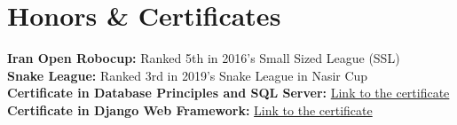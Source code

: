 
\section{Honors \& Certificates}
  \vspace{2pt}
  \resumeSubHeadingListStart
    \small{\item{
        \textbf{Iran Open Robocup:} { Ranked 5th in 2016's Small Sized League (SSL)}
        \\ \vspace{3pt}
        \textbf{Snake League:} { Ranked 3rd in 2019's Snake League in Nasir Cup}
        \\ \vspace{3pt}
        \textbf{Certificate in Database Principles and SQL Server:} \href{https://maktabkhooneh.org/certificates/MK-O1USZA/?print=True}{\color{blue} Link to the certificate}
        \\ \vspace{3pt}
        \textbf{Certificate in Django Web Framework:} \href{https://www.coursera.org/account/accomplishments/verify/ZZDP44XE9B4G}{\color{blue} Link to the certificate}


    
        
}}
